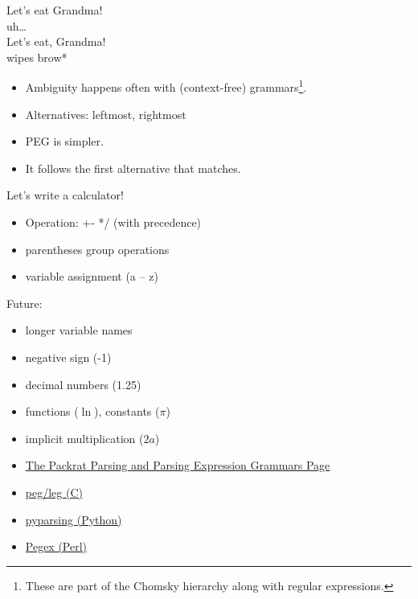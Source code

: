 \documentclass[%
        hyperref={%
                pdfauthor={Zakariyya Mughal},%
                pdfpagemode={None},pdfpagelayout={SinglePage}}%
        xcolor={x11names},%
]{beamer}
\begin{document}
\begin{frame}
    \Huge
    Let's eat Grandma! \\
    \pause\qquad uh\ldots \\
    \pause Let's eat, Grandma! \\
    \pause\qquad *wipes brow* \\
\end{frame}

\begin{frame}
	\begin{itemize}
		\item Ambiguity happens often with (context-free)
			grammars\footnote{These are part of the Chomsky hierarchy
			along with regular expressions.}.
		\pause\item Alternatives: leftmost, rightmost
	\end{itemize}
\end{frame}

\begin{frame}
	\begin{itemize}
		\item PEG is simpler.
		\pause\item It follows the first alternative that
			matches.
	\end{itemize}
\end{frame}

\begin{frame}
	\begin{center}
		\Huge
		Let's write a calculator!
	\end{center}
	\begin{itemize}
		\item Operation: +- */ (with precedence)
		\item parentheses group operations
		\item variable assignment (a -- z)
	\end{itemize}
\end{frame}

\begin{frame}
	Future:
	\begin{itemize}
		\item longer variable names
		\item negative sign (-1)
		\item decimal numbers (1.25)
		\item functions (\(\ln\)), constants (\(\pi\))
		\item implicit multiplication (\(2a\))
	\end{itemize}
\end{frame}

\begin{frame}
	\begin{itemize}
		\item \href{http://bford.info/packrat/}{The Packrat Parsing and Parsing Expression Grammars Page}
		\item \href{http://piumarta.com/software/peg/}{peg/leg (C)}
		\item \href{http://pyparsing.wikispaces.com/}{pyparsing (Python)}
		\item \href{http://pegex.org/}{Pegex (Perl)}
	\end{itemize}
\end{frame}
\end{document}
